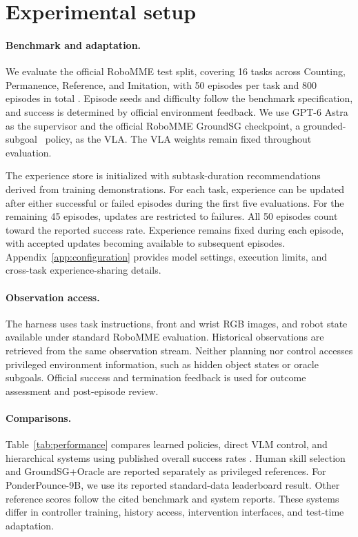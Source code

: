 
\section{Experimental setup}
\label{sec:setup}

\paragraph{Benchmark and adaptation.}
We evaluate the official RoboMME test split, covering 16 tasks across Counting, Permanence, Reference, and Imitation, with 50 episodes per task and 800 episodes in total . Episode seeds and difficulty follow the benchmark specification, and success is determined by official environment feedback. We use GPT-6 Astra as the supervisor and the official RoboMME GroundSG checkpoint, a grounded-subgoal \pifive\ policy, as the VLA. The VLA weights remain fixed throughout evaluation.

The experience store is initialized with subtask-duration recommendations derived from training demonstrations. For each task, experience can be updated after either successful or failed episodes during the first five evaluations. For the remaining 45 episodes, updates are restricted to failures. All 50 episodes count toward the reported success rate. Experience remains fixed during each episode, with accepted updates becoming available to subsequent episodes. Appendix~\ref{app:configuration} provides model settings, execution limits, and cross-task experience-sharing details.

\paragraph{Observation access.}
The harness uses task instructions, front and wrist RGB images, and robot state available under standard RoboMME evaluation. Historical observations are retrieved from the same observation stream. Neither planning nor control accesses privileged environment information, such as hidden object states or oracle subgoals. Official success and termination feedback is used for outcome assessment and post-episode review.

\paragraph{Comparisons.}
Table~\ref{tab:performance} compares learned policies, direct VLM control, and hierarchical systems using published overall success rates . Human skill selection and GroundSG+Oracle are reported separately as privileged references. For PonderPounce-9B, we use its reported standard-data leaderboard result. Other reference scores follow the cited benchmark and system reports. These systems differ in controller training, history access, intervention interfaces, and test-time adaptation.

